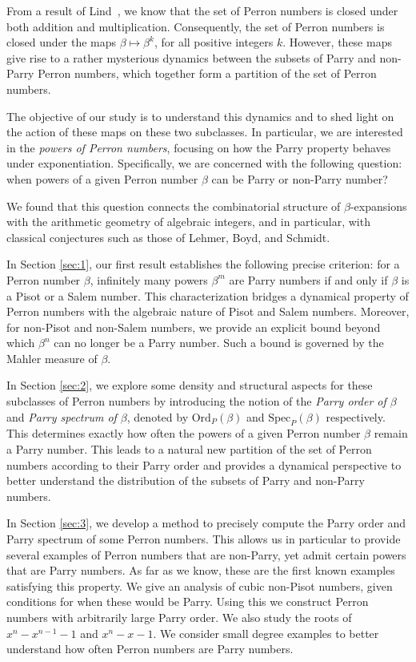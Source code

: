 \documentclass[12pt]{article}
\theoremstyle{plain}
\theoremstyle{remark}
\newcommand{\OrdP}{\mathrm{Ord}_{P}}
\newcommand{\SpecP}{\mathrm{Spec}_{P}}
\begin{document}
From a result of Lind~\cite[Proposition~1]{Lind1984}, we know that the set of Perron numbers is closed
under both addition and multiplication. Consequently,  the set of Perron numbers is closed under the maps
$
\beta \longmapsto \beta^k $, for all positive integers $k$. However, these maps give rise to a rather mysterious dynamics  between the subsets of 
Parry  and non-Parry  Perron numbers, which together form a
partition of the set of Perron numbers.

The objective of our study is to understand this dynamics and to shed light on
the action of these maps on these two subclasses.
In particular, we are interested in the \emph{powers of Perron numbers}, focusing on how the Parry property behaves under exponentiation. Specifically, we are concerned with the following question: when powers of a given Perron number $\beta$ can be Parry or non-Parry number?

We found that this question connects the combinatorial structure of $\beta$-expansions with the arithmetic geometry of algebraic integers, and in particular, with classical conjectures such as those of Lehmer, Boyd, and Schmidt.

In Section \ref{sec:1}, our first result establishes the following precise criterion: {for a Perron number $\beta$, infinitely many powers $\beta^m$ are Parry numbers if and only if $\beta$ is a Pisot or a Salem number}. This characterization bridges a dynamical property of Perron numbers with the algebraic nature of Pisot and Salem numbers. Moreover, for non-Pisot and non-Salem numbers, we provide an explicit bound beyond which $\beta^n$ can no longer be a Parry number.  Such a bound is governed by the Mahler measure of $\beta$.

In Section \ref{sec:2}, we explore some density and structural aspects for these subclasses of Perron numbers by introducing the notion of the \emph{Parry order of $\beta$} and \emph{Parry spectrum of $\beta$}, denoted by $\OrdP (\beta)$ and $\SpecP(\beta)$ respectively.  This determines exactly how often the powers of a given Perron number $\beta$ remain a Parry number. This leads to a natural new partition of the set of Perron numbers according to their Parry order and provides a dynamical perspective to better understand the distribution of the subsets of Parry and non-Parry numbers.

In Section \ref{sec:3}, we develop a method to precisely compute the Parry order and Parry spectrum of some Perron numbers. This allows us in particular to provide several examples of Perron numbers that are non-Parry, yet admit certain powers that are Parry numbers. As far as we know, these are the first known examples satisfying this property. 
We give an analysis of cubic non-Pisot numbers, given conditions for when 
    these would be Parry.
Using this we construct Perron numbers with arbitrarily large
    Parry order.
We also study the roots of $x^n - x^{n-1}-1$ and $x^n - x- 1$.
We consider small degree examples to better understand how often Perron numbers are Parry numbers. 
\end{document}
